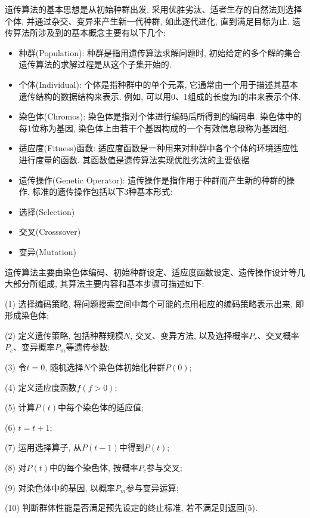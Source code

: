 {遗传算法的基本思想是从初始种群出发, 采用优胜劣汰、适者生存的自然法则选择个体, 并通过杂交、变异来产生新一代种群, 如此逐代进化, 直到满足目标为止. 遗传算法所涉及到的基本概念主要有以下几个:
\begin{itemize}
\item 种群(Population): 种群是指用遗传算法求解问题时, 初始给定的多个解的集合. 遗传算法的求解过程是从这个子集开始的.
\item 个体(Individual): 个体是指种群中的单个元素, 它通常由一个用于描述其基本遗传结构的数据结构来表示. 例如, 可以用0、1组成的长度为l的串来表示个体.
\item 染色体(Chromos): 染色体是指对个体进行编码后所得到的编码串. 染色体中的每1位称为基因, 染色体上由若干个基因构成的一个有效信息段称为基因组.
\item 适应度(Fitness)函数: 适应度函数是一种用来对种群中各个个体的环境适应性进行度量的函数. 其函数值是遗传算法实现优胜劣汰的主要依据
\item 遗传操作(Genetic Operator): 遗传操作是指作用于种群而产生新的种群的操作. 标准的遗传操作包括以下3种基本形式:
\item 选择(Selection)
\item 交叉(Crosssover)
\item 变异(Mutation)
\end{itemize}

遗传算法主要由染色体编码、初始种群设定、适应度函数设定、遗传操作设计等几大部分所组成, 其算法主要内容和基本步骤可描述如下:

(1) 选择编码策略, 将问题搜索空间中每个可能的点用相应的编码策略表示出来, 即形成染色体;

(2) 定义遗传策略, 包括种群规模$N$, 交叉、变异方法, 以及选择概率$P_r$、交叉概率$P_c$、变异概率$P_m$等遗传参数;

(3) 令$t=0$, 随机选择$N$个染色体初始化种群$P(0)$;

(4) 定义适应度函数$f(f>0)$;

(5) 计算$P(t)$中每个染色体的适应值;

(6) $t=t+1$;

(7) 运用选择算子, 从$P(t-1)$中得到$P(t)$;

(8) 对$P(t)$中的每个染色体, 按概率$P_c$参与交叉;

(9) 对染色体中的基因, 以概率$P_m$参与变异运算;

(10) 判断群体性能是否满足预先设定的终止标准, 若不满足则返回(5).

}
